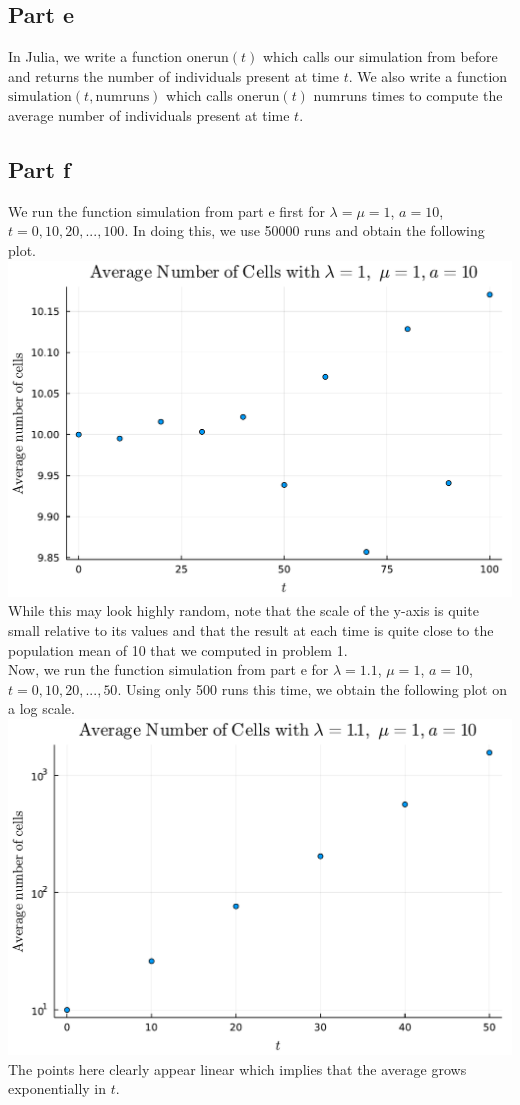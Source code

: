 \documentclass{article}
\begin{document}
\subsection{Part e}
In Julia, we write a function $\text{onerun}(t)$ which calls our simulation from before and returns the number of individuals present at time $t$. We also write a function $\text{simulation}(t,\text{numruns})$ which calls $\text{onerun}(t)$ numruns times to compute the average number of individuals present at time $t$.

\subsection{Part f}
We run the function simulation from part e first for $\lambda=\mu=1$, $a=10$, $t=0, 10,20,...,100$. In doing this, we use 50000 runs and obtain the following plot. \\
\includegraphics[scale=0.5]{pf1.pdf}\\
While this may look highly random, note that the scale of the y-axis is quite small relative to its values and that the result at each time is quite close to the population mean of 10 that we computed in problem 1. \\
Now, we run the function simulation from part e for $\lambda=1.1$, $\mu=1$, $a=10$, $t=0, 10,20,...,50$. Using only 500 runs this time, we obtain the following plot on a log scale. \\
\includegraphics[scale=0.5]{pf2.pdf}\\
The points here clearly appear linear which implies that the average grows exponentially in $t$. 
\end{document}
